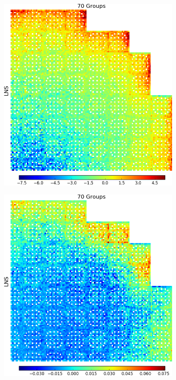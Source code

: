 \begin{figure}[h!]
\begin{subfigure}{.5\textwidth}
  \caption{}
  \label{fig:chap9-full-core-null-magnitude}
\end{subfigure}
\begin{subfigure}{.5\textwidth}
  \centering
  \includegraphics[width=0.9\linewidth]{figures/patterns/lns/full-core/capt-err-lns}
  \caption{}
  \label{fig:chap9-full-core-lns}
\end{subfigure}%
\begin{subfigure}{.5\textwidth}
  \centering
  \includegraphics[width=0.9\linewidth]{figures/patterns/lns/full-core/capt-err-lns-magnitude}

\end{subfigure}
\end{figure}
